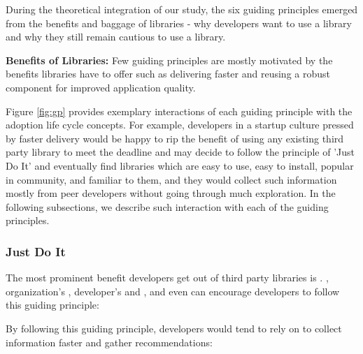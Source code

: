During the theoretical integration of our study, the six guiding principles emerged from the benefits and baggage of libraries - why developers want to use a library and why they still remain cautious to use a library.

\begin{tcolorbox}[flushleft upper,boxrule=1pt,arc=0pt,left=0pt,right=0pt,top=0pt,bottom=0pt,colback=white,after=\ignorespacesafterend\par\noindent]
\textbf{Benefits of Libraries:} Few guiding principles are mostly motivated by the benefits libraries have to offer such as delivering faster and reusing a robust component for improved application quality.
\end{tcolorbox}

Figure \ref{fig:gp} provides exemplary interactions of each guiding principle with the adoption life cycle concepts. For example, developers in a startup culture pressed by faster delivery would be happy to rip the benefit of using any existing third party library to meet the deadline and may decide to follow the principle of 'Just Do It' and eventually find libraries which are easy to use, easy to install, popular in community, and familiar to them, and they would collect such information mostly from peer developers without going through much exploration. In the following subsections, we describe such interaction with each of the guiding principles.

\subsubsection{Just Do It} 
The most prominent benefit developers get out of third party libraries is . , organization's , developer's  and , and even  can encourage developers to follow this guiding principle: 

By following this guiding principle, developers would tend to rely on  to collect information faster and gather recommendations: 

